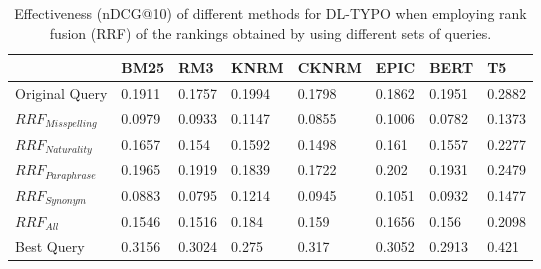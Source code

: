\begin{table}[ht]
\centering
\caption{Effectiveness (nDCG@10) of different methods for DL-TYPO when employing rank fusion (RRF) of the rankings obtained by using different sets of queries.}
\label{tab:typo-fusion-table}
\begin{tabularx}{\columnwidth}{l|X|X|X|X|X|X|X}

\textbf{} & \textbf{BM25} & \textbf{RM3} & \textbf{KNRM} & \textbf{CKNRM} & \textbf{EPIC} & \textbf{BERT} & \textbf{T5} \\ \hline
Original Query   & 0.1911 & 0.1757 & 0.1994 & 0.1798 & 0.1862 & 0.1951 & 0.2882 \\ \hline
$RRF_{Misspelling}$ & 0.0979 & 0.0933 & 0.1147 & 0.0855 & 0.1006 & 0.0782 & 0.1373 \\
$RRF_{Naturality}$  & 0.1657 & 0.154  & 0.1592 & 0.1498 & 0.161  & 0.1557 & 0.2277 \\
$RRF_{Paraphrase}$  & 0.1965 & 0.1919 & 0.1839 & 0.1722 & 0.202  & 0.1931 & 0.2479 \\
$RRF_{Synonym}$     & 0.0883 & 0.0795 & 0.1214 & 0.0945 & 0.1051 & 0.0932 & 0.1477 \\
$RRF_{All}$         & 0.1546 & 0.1516 & 0.184  & 0.159  & 0.1656 & 0.156  & 0.2098 \\ \hline
Best Query        & 0.3156 & 0.3024 & 0.275  & 0.317  & 0.3052 & 0.2913 & 0.421 
\end{tabularx}
\end{table}
